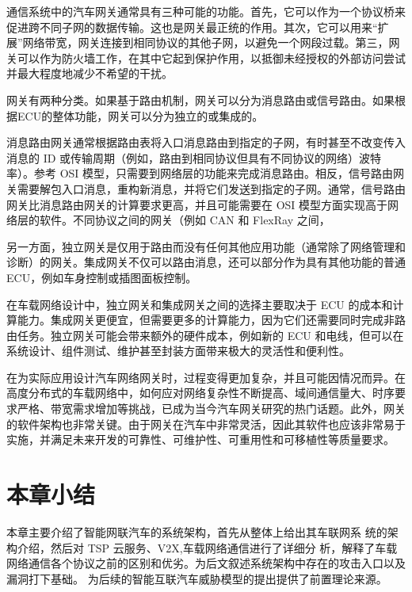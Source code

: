 通信系统中的汽车网关通常具有三种可能的功能。首先，它可以作为一个协议桥来促进跨不同子网的数据传输。这也是网关最正统的作用。其次，它可以用来“扩展”网络带宽，网关连接到相同协议的其他子网，以避免一个网段过载。第三，网关可以作为防火墙工作，在其中它起到保护作用，以抵御未经授权的外部访问尝试并最大程度地减少不希望的干扰。

网关有两种分类。如果基于路由机制，网关可以分为消息路由或信号路由。如果根据ECU的整体功能，网关可以分为独立的或集成的。

消息路由网关通常根据路由表将入口消息路由到指定的子网，有时甚至不改变传入消息的 ID 或传输周期（例如，路由到相同协议但具有不同协议的网络）波特率）。参考 OSI 模型，只需要到网络层的功能来完成消息路由。相反，信号路由网关需要解包入口消息，重构新消息，并将它们发送到指定的子网。通常，信号路由网关比消息路由网关的计算要求更高，并且可能需要在 OSI 模型方面实现高于网络层的软件。不同协议之间的网关（例如 CAN 和 FlexRay 之间，

另一方面，独立网关是仅用于路由而没有任何其他应用功能（通常除了网络管理和诊断）的网关。集成网关不仅可以路由消息，还可以部分作为具有其他功能的普通 ECU，例如车身控制或插图面板控制。

在车载网络设计中，独立网关和集成网关之间的选择主要取决于 ECU 的成本和计算能力。集成网关更便宜，但需要更多的计算能力，因为它们还需要同时完成非路由任务。独立网关可能会带来额外的硬件成本，例如新的 ECU 和电线，但可以在系统设计、组件测试、维护甚至封装方面带来极大的灵活性和便利性。

在为实际应用设计汽车网络网关时，过程变得更加复杂，并且可能因情况而异。在高度分布式的车载网络中，如何应对网络复杂性不断提高、域间通信量大、时序要求严格、带宽需求增加等挑战，已成为当今汽车网关研究的热门话题。此外，网关的软件架构也非常关键。由于网关在汽车中非常灵活，因此其软件也应该非常易于实施，并满足未来开发的可靠性、可维护性、可重用性和可移植性等质量要求。

\section{本章小结}

本章主要介绍了智能网联汽车的系统架构，首先从整体上给出其车联网系
统的架构介绍，然后对 TSP 云服务、V2X,车载网络通信进行了详细分
析，解释了车载网络通信各个协议之前的区别和优劣。为后文叙述系统架构中存在的攻击入口以及漏洞打下基础。
为后续的智能互联汽车威胁模型的提出提供了前置理论来源。